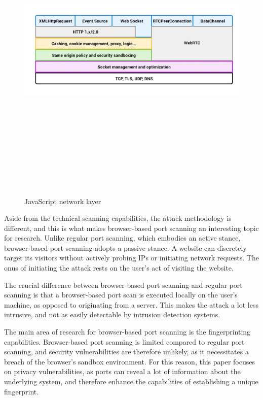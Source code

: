 \begin{figure}[h]
    \centering
    \includegraphics[width=15cm, height=15cm, keepaspectratio]{background/img/js_network_stack.jpg}
    \caption{JavaScript network layer~\cite{medium_js_networking}}
    \label{fig:js-network-stack}
\end{figure}


Aside from the technical scanning capabilities, the attack methodology is different, and this is what makes browser-based port scanning an interesting topic for research. 
Unlike regular port scanning, which embodies an active stance, browser-based port scanning adopts a passive stance. A website can discretely target its visitors without actively probing IPs or initiating network requests. The onus of initiating the attack rests on the user's act of visiting the website. 

The crucial difference between browser-based port scanning and regular port scanning is that a browser-based port scan is executed locally on the user's machine, as opposed to originating from a server. This makes the attack a lot less intrusive, and not as easily detectable by intrusion detection systems. 

The main area of research for browser-based port scanning is the fingerprinting capabilities. 
Browser-based port scanning is limited compared to regular port scanning, and security vulnerabilities are therefore unlikely, as it necessitates a breach of the browser's sandbox environment. For this reason, this paper focuses on privacy vulnerabilities, as ports can reveal a lot of information about the underlying system, and therefore enhance the capabilities of establishing a unique fingerprint.


